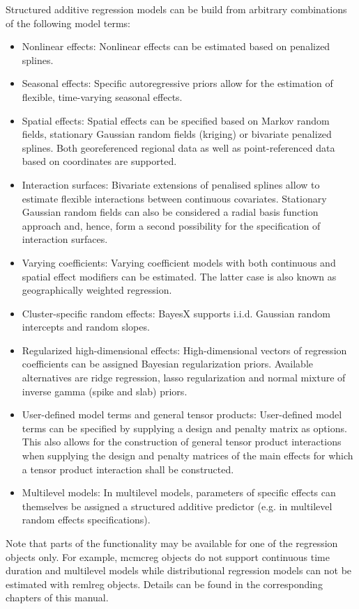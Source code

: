 Structured additive regression models can be build from arbitrary combinations of the following model terms:
\begin{itemize}
 \item Nonlinear effects: Nonlinear effects can be estimated based on penalized splines.
 \item Seasonal effects: Specific autoregressive priors allow for the estimation of flexible, time-varying seasonal effects.
 \item Spatial effects: Spatial effects can be specified based on Markov random fields, stationary Gaussian random fields (kriging) or bivariate penalized splines. Both georeferenced regional data as well as point-referenced data based on coordinates are supported.
 \item Interaction surfaces: Bivariate extensions of penalised splines allow to estimate flexible interactions between continuous covariates. Stationary Gaussian random fields can also be considered a radial basis function approach and, hence, form a second possibility for the specification of interaction surfaces.
 \item Varying coefficients: Varying coefficient models with both continuous and spatial effect modifiers can be estimated. The latter case is also known as geographically weighted regression.
 \item Cluster-specific random effects: BayesX supports i.i.d. Gaussian random intercepts and random slopes.
 \item Regularized high-dimensional effects: High-dimensional vectors of regression coefficients can be assigned Bayesian regularization priors. Available alternatives are ridge regression, lasso regularization and normal mixture of inverse gamma (spike and slab) priors.
 \item User-defined model terms and general tensor products: User-defined model terms can be specified by supplying a design and penalty matrix as options. This also allows for the construction of general tensor product interactions when supplying the design and penalty matrices of the main effects for which a tensor product interaction shall be constructed.
 \item Multilevel models: In multilevel models, parameters of specific effects can themselves be assigned a structured additive predictor (e.g. in multilevel random effects specifications).
\end{itemize}

Note that parts of the functionality may be available for one of the regression objects only. For example, mcmcreg objects do not support continuous time duration and multilevel models while distributional regression models can not be estimated with remlreg objects. Details can be found in the corresponding chapters of this manual.


